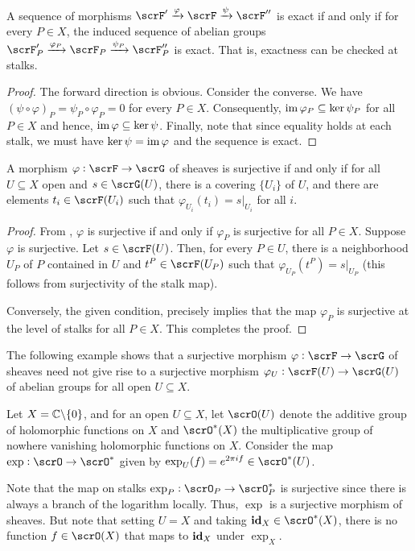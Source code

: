 \begin{theorem}
    A sequence of morphisms $\scrF'\xrightarrow{\varphi}\scrF\xrightarrow{\psi}\scrF''$ is exact if and only if for every $P\in X$, the induced sequence of abelian groups $\scrF'_P\xrightarrow{\varphi_P}\scrF_P\xrightarrow{\psi_P}\scrF''_P$ is exact. That is, exactness can be checked at stalks.
\end{theorem}
\begin{proof}
    The forward direction is obvious. Consider the converse. We have $(\psi\circ\varphi)_P = \psi_P\circ\varphi_P = 0$ for every $P\in X$. Consequently, $\operatorname{im}\varphi_P\subseteq\ker\psi_P$ for all $P\in X$ and hence, $\operatorname{im}\varphi\subseteq\ker\psi$. Finally, note that since equality holds at each stalk, we must have $\ker\psi = \operatorname{im}\varphi$ and the sequence is exact. 
\end{proof}

\begin{lemma}
    A morphism $\varphi:\scrF\to\scrG$ of sheaves is surjective if and only if for all $U\subseteq X$ open and $s\in\scrG(U)$, there is a covering $\{U_i\}$ of $U$, and there are elements $t_i\in\scrF(U_i)$ such that $\varphi_{U_i}(t_i) = s|_{U_i}$ for all $i$.
\end{lemma}
\begin{proof}
    From , $\varphi$ is surjective if and only if $\varphi_P$ is surjective for all $P\in X$. Suppose $\varphi$ is surjective. Let $s\in\scrF(U)$. Then, for every $P\in U$, there is a neighborhood $U_P$ of $P$ contained in $U$ and $t^P\in\scrF(U_P)$ such that $\varphi_{U_P}(t^P) = s|_{U_P}$ (this follows from surjectivity of the stalk map).

    Conversely, the given condition, precisely implies that the map $\varphi_P$ is surjective at the level of stalks for all $P\in X$. This completes the proof.
\end{proof}

\begin{example}
    The following example shows that a surjective morphism $\varphi:\scrF\to\scrG$ of sheaves need not give rise to a surjective morphism $\varphi_U:\scrF(U)\to\scrG(U)$ of abelian groups for all open $U\subseteq X$.

    Let $X = \mathbb{C}\backslash\{0\}$, and for an open $U\subseteq X$, let $\scrO(U)$ denote the additive group of holomorphic functions on $X$ and $\scrO^\ast(X)$ the multiplicative group of nowhere vanishing holomorphic functions on $X$. Consider the map $\exp:\scrO\to\scrO^\ast$ given by $\exp_U(f) = e^{2\pi if}\in\scrO^\ast(U)$. 

    Note that the map on stalks $\exp_P:\scrO_P\to\scrO^\ast_P$ is surjective since there is always a branch of the logarithm locally. Thus, $\exp$ is a surjective morphism of sheaves. But note that setting $U = X$ and taking $\id_X\in\scrO^\ast(X)$, there is no function $f\in\scrO(X)$ that maps to $\mathbf{id}_X$ under $\exp_X$. 
\end{example}


